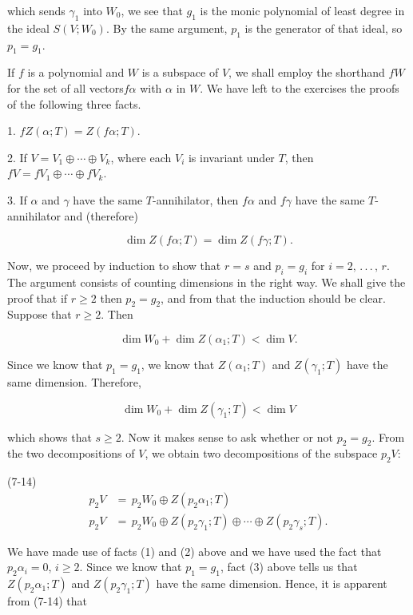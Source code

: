 which sends \(\gamma_{1}\) into \(W_{0}\), we see that \(g_{1}\) is the monic polynomial of least degree in the ideal \(S(V;W_{0})\). By the same argument, \(p_{1}\) is the generator of that ideal, so \(p_{1}=g_{1}\).

If \(f\) is a polynomial and \(W\) is a subspace of \(V\), we shall employ the shorthand \(fW\) for the set of all vectors\(f\alpha\) with \(\alpha\) in \(W\). We have left to the exercises the proofs of the following three facts.

1. \(fZ(\alpha;T)=Z(f\alpha;T)\).

2. If \(V=V_{1}\oplus\cdots\oplus V_{k}\), where each \(V_{i}\) is invariant under \(T\), then \(fV=fV_{1}\oplus\cdots\oplus fV_{k}\).

3. If \(\alpha\) and \(\gamma\) have the same \(T\)-annihilator, then \(f\alpha\) and \(f\gamma\) have the same \(T\)-annihilator and (therefore)

\[\dim Z(f\alpha;T)=\dim Z(f\gamma;T).\]

Now, we proceed by induction to show that \(r=s\) and \(p_{i}=g_{i}\) for \(i=2,\,.\,.\,.\,,\,r\). The argument consists of counting dimensions in the right way. We shall give the proof that if \(r\geq 2\) then \(p_{2}=g_{2}\), and from that the induction should be clear. Suppose that \(r\geq 2\). Then

\[\dim W_{0}+\dim Z(\alpha_{1};T)<\dim V.\]

Since we know that \(p_{1}=g_{1}\), we know that \(Z(\alpha_{1};T)\) and \(Z(\gamma_{1};T)\) have the same dimension. Therefore,

\[\dim W_{0}+\dim Z(\gamma_{1};T)<\dim V\]

which shows that \(s\geq 2\). Now it makes sense to ask whether or not \(p_{2}=g_{2}\). From the two decompositions of \(V\), we obtain two decompositions of the subspace \(p_{2}V\):

(7-14) \[\begin{array}{rl}p_{2}V&=\,p_{2}W_{0}\oplus Z(p_{2}\alpha_{1};T)\\ p_{2}V&=\,p_{2}W_{0}\oplus Z(p_{2}\gamma_{1};T)\oplus\cdots\oplus Z(p_{2} \gamma_{s};T).\end{array}\]

We have made use of facts (1) and (2) above and we have used the fact that \(p_{2}\alpha_{i}=0\), \(i\geq 2\). Since we know that \(p_{1}=g_{1}\), fact (3) above tells us that \(Z(p_{2}\alpha_{1};T)\) and \(Z(p_{2}\gamma_{1};T)\) have the same dimension. Hence, it is apparent from (7-14) that

